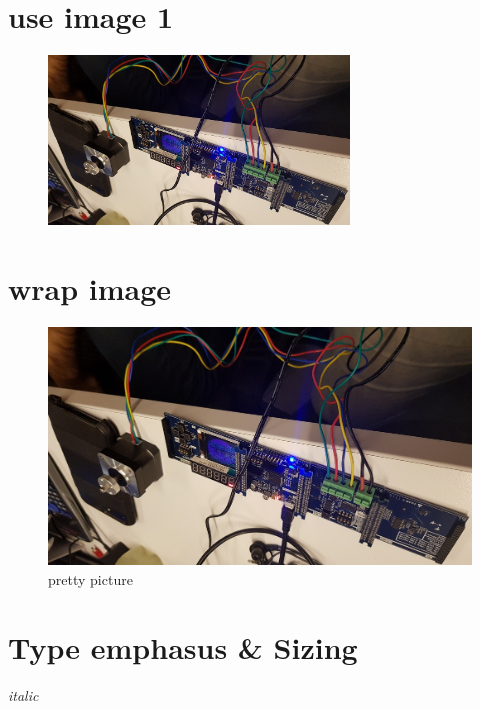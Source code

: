 \documentclass[a4paper,12pt]{book}
\begin{document}
\pagebreak
    \section {use image 1}
    \begin{figure}[ht]
        \centering
        \includegraphics[width=8cm]{microcontoller.jpg}
    \end{figure}
    \blindtext[9]



\newpage
    \section*{wrap image}
    \begingroup
    \setlength{\intextsep}{0pt}
    \setlength{\columnsep}{15pt}

    \begin{figure}
        \centering
        \includegraphics[width=\linewidth]{microcontoller.jpg}
        \caption{pretty picture}\label{fig:prettypic}
    \end{figure}
    \blindtext[1]
    
    \endgroup

\section[Type]{\textsf{Type emphasus \& Sizing}} 
\label{sec:typeemp}
\itshape italic
\end{document}
